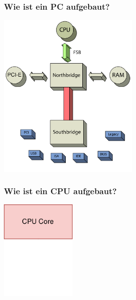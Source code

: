 \documentclass{beamer}
\begin{document}
%
\begin{frame}[t]
\frametitle{Wie ist ein PC aufgebaut?}
\centering
\includegraphics[width=7cm]{architecture7.png}
\end{frame}

\begin{frame}[t]
\frametitle{Wie ist ein CPU aufgebaut?}
\centering
\includegraphics[height=5cm]{cpu1.PNG}
\end{frame}
\end{document}
